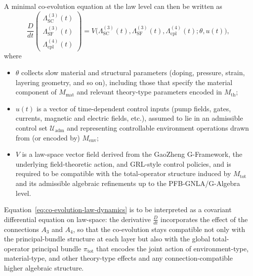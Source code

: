 \documentclass[11pt]{book}
\theoremstyle{plain}
\theoremstyle{definition}
\theoremstyle{remark}
\begin{document}
A minimal co-evolution equation at the law level can then be written as
\begin{equation}
  \frac{D}{dt}
  \begin{pmatrix}
    \Lambda_{\mathrm{SC}}^{(3)}(t) \\
    \Lambda_{\mathrm{SF}}^{(3)}(t) \\
    \Lambda_{\mathrm{cpl}}^{(4)}(t)
  \end{pmatrix}
  =
  V\bigl(
    \Lambda_{\mathrm{SC}}^{(3)}(t),
    \Lambda_{\mathrm{SF}}^{(3)}(t),
    \Lambda_{\mathrm{cpl}}^{(4)}(t);
    \theta, u(t)
  \bigr),
  \label{eq:co-evolution-law-dynamics}
\end{equation}
where
\begin{itemize}
  \item $\theta$ collects slow material and structural parameters
        (doping, pressure, strain, layering geometry, and so on),
        including those that specify the material component of
        $M_{\mathrm{mat}}$ and relevant theory-type parameters
        encoded in $M_{\mathrm{th}}$;
  \item $u(t)$ is a vector of time-dependent control inputs
        (pump fields, gates, currents, magnetic and electric fields,
        etc.), assumed to lie in an admissible control set
        $\mathcal{U}_{\mathrm{adm}}$ and representing controllable
        environment operations drawn from (or encoded by)
        $M_{\mathrm{env}}$;
  \item $V$ is a law-space vector field derived from the GaoZheng
        G-Framework, the underlying field-theoretic action, and
        GRL-style control policies, and is required to be compatible
        with the total-operator structure induced by $M_{\mathrm{tot}}$
        and its admissible algebraic refinements up to the
        PFB-GNLA/G-Algebra level.
\end{itemize}
Equation~\eqref{eq:co-evolution-law-dynamics} is to be interpreted as a
covariant differential equation on law-space: the derivative
$\frac{D}{dt}$ incorporates the effect of the connections $A_3$ and
$A_4$, so that the co-evolution stays compatible not only with the
principal-bundle structure at each layer but also with the global
total-operator principal bundle $\pi_{\mathrm{tot}}$ that encodes the
joint action of environment-type, material-type, and other theory-type
effects and any connection-compatible higher algebraic structure.
\end{document}
